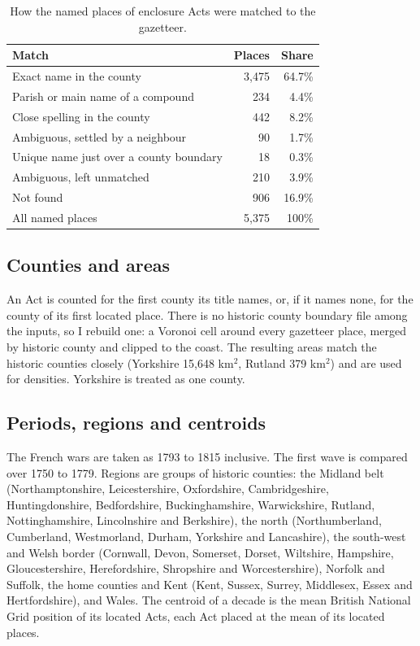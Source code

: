 \documentclass[11pt,a4paper]{article}
\begin{document}
\begin{table}[tbp]\centering\small\caption{How the named places of enclosure Acts were matched to the gazetteer.}\label{tab:geo}\begin{tabular}{lrr}\toprule Match & Places & Share\\\midrule
Exact name in the county & 3,475 & 64.7\%\\
Parish or main name of a compound & 234 & 4.4\%\\
Close spelling in the county & 442 & 8.2\%\\
Ambiguous, settled by a neighbour & 90 & 1.7\%\\
Unique name just over a county boundary & 18 & 0.3\%\\
Ambiguous, left unmatched & 210 & 3.9\%\\
Not found & 906 & 16.9\%\\
\midrule All named places & 5,375 & 100\%\\
\bottomrule\end{tabular}\end{table}

\subsection{Counties and areas}
An Act is counted for the first county its title names, or, if it names none, for the county of its first located place. There is no historic county boundary file among the inputs, so I rebuild one: a Voronoi cell around every gazetteer place, merged by historic county and clipped to the coast. The resulting areas match the historic counties closely (Yorkshire 15,648 km$^2$, Rutland 379 km$^2$) and are used for densities. Yorkshire is treated as one county.

\subsection{Periods, regions and centroids}
The French wars are taken as 1793 to 1815 inclusive. The first wave is compared over 1750 to 1779. Regions are groups of historic counties: the Midland belt (Northamptonshire, Leicestershire, Oxfordshire, Cambridgeshire, Huntingdonshire, Bedfordshire, Buckinghamshire, Warwickshire, Rutland, Nottinghamshire, Lincolnshire and Berkshire), the north (Northumberland, Cumberland, Westmorland, Durham, Yorkshire and Lancashire), the south-west and Welsh border (Cornwall, Devon, Somerset, Dorset, Wiltshire, Hampshire, Gloucestershire, Herefordshire, Shropshire and Worcestershire), Norfolk and Suffolk, the home counties and Kent (Kent, Sussex, Surrey, Middlesex, Essex and Hertfordshire), and Wales. The centroid of a decade is the mean British National Grid position of its located Acts, each Act placed at the mean of its located places.
\end{document}
